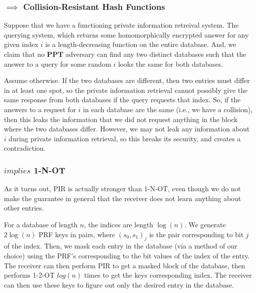 \documentclass[11pt]{article}
\newcommand{\PPT}{\mathbf{PPT}}
\begin{document}
\subsubsection{\(\implies\) Collision-Resistant Hash Functions}
Suppose that we have a functioning private information retreival system.
The querying system, which returns some homomorphically encrypted answer for any given index \(i\) is a length-decreasing function on the entire database.
And, we claim that no \(\PPT\) adversary can find any two distinct databases such that the answer to a query for some random \(i\) looks the same for both databases.\medskip

Assume otherwise. If the two databases are different, then two entries must differ in at least one spot, so the private information retrieval cannot possibly give the same response from both databases if the query requests that index. 
So, if the answers to a request for \(i\) in each database are the same (i.e., we have a collision), then this leaks the information that we did not request anything in the block where the two databases differ.
However, we may not leak any information about \(i\) during private information retrieval, so this breaks its security, and creates a contradiction.

\subsubsection{\(implies\) 1-N-OT}
As it turns out, PIR is actually stronger than 1-N-OT, even though we do not make the guarantee in general that the receiver does not learn anything about other entries.

For a database of length \(n\), the indices are length \(\log(n)\).
We generate \(2\log(n)\) PRF keys in pairs, where \((s_0,s_1)_j\) is the pair corresponding to bit \(j\) of the index.
Then, we mask each entry in the database (via a method of our choice) using the PRF's corresponding to the bit values of the index of the entry.
The receiver can then perform PIR to get a masked block of the database,
then performs 1-2-OT \(log(n)\) times to get the keys corresponding index.
The receiver can then use these keys to figure out only the desired entry in the database.
\end{document}
